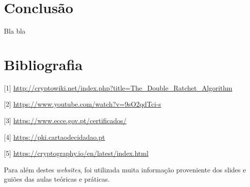 \documentclass[10pt,english]{article}
\begin{document}
\clearpage


\section{Conclusão}

\par Bla bla

\clearpage

\section{Bibliografia}





\vspace{5mm} %

[1] \url{http://cryptowiki.net/index.php?title=The_Double_Ratchet_Algorithm}

[2] \url{https://www.youtube.com/watch?v=9sO2qdTci-s}

[3] \url{https://www.ecce.gov.pt/certificados/}

[4] \url{https://pki.cartaodecidadao.pt}

[5] \url{https://cryptography.io/en/latest/index.html}

\par Para além destes \textit{websites}, foi utilizada muita informação proveniente dos slides e guiões das aulas teóricas e práticas.
\end{document}
